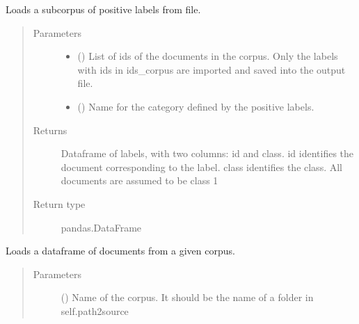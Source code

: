 \documentclass[letterpaper,10pt,english]{sphinxmanual}
\begin{document}
\begin{fulllineitems}
\begin{fulllineitems}
\label{\detokenize{dc_data_manager:src.data_manager.DataManager.import_labels}}
\sphinxAtStartPar
Loads a subcorpus of positive labels from file.
\begin{quote}\begin{description}
\item[{Parameters}] \leavevmode\begin{itemize}
\item {} 
\sphinxAtStartPar
{} () \textendash{} List of ids of the documents in the corpus. Only the labels with
ids in ids\_corpus are imported and saved into the output file.

\item {} 
\sphinxAtStartPar
{} () \textendash{} Name for the category defined by the positive labels.

\end{itemize}

\item[{Returns}] \leavevmode
\sphinxAtStartPar
{} \textendash{} Dataframe of labels, with two columns: id and class.
id identifies the document corresponding to the label.
class identifies the class. All documents are assumed to be class 1

\item[{Return type}] \leavevmode
\sphinxAtStartPar
pandas.DataFrame

\end{description}\end{quote}

\end{fulllineitems}


\begin{fulllineitems}
\label{\detokenize{dc_data_manager:src.data_manager.DataManager.load_corpus}}
\sphinxAtStartPar
Loads a dataframe of documents from a given corpus.
\begin{quote}\begin{description}
\item[{Parameters}] \leavevmode
\sphinxAtStartPar
{} () \textendash{} Name of the corpus. It should be the name of a folder in
self.path2source


\end{description}
\end{quote}
\end{fulllineitems}
\end{fulllineitems}
\end{document}
